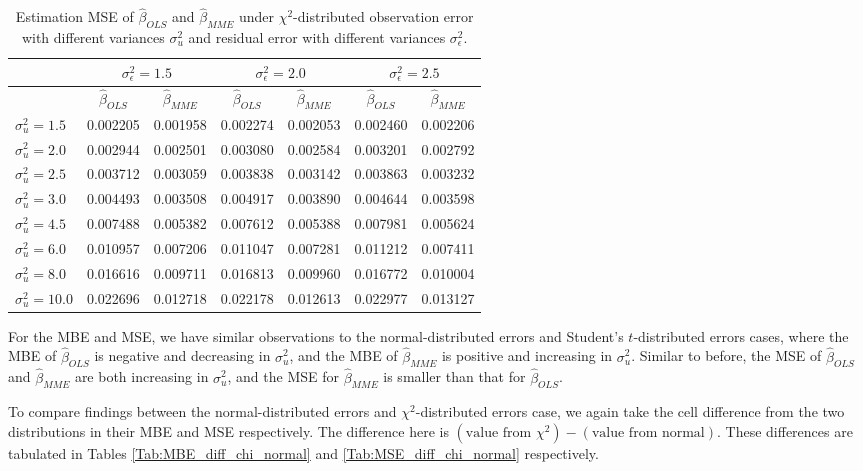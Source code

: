 \documentclass{article}
\begin{document}
\begin{table}[ht]
    \centering
    \caption{Estimation MSE of $\hat{\beta}_{OLS}$ and $\hat{\beta}_{MME}$ under $\chi^2$-distributed observation error with different variances $\sigma^2_u$ and residual error with different variances $\sigma^2_\epsilon$.}
    \label{Tab:MSE_chi}
    \begin{tabular}[t]{lcccccc}
        \hline
        &\multicolumn{2}{c}{$\sigma^2_\epsilon=1.5$}&\multicolumn{2}{c}{$\sigma^2_\epsilon=2.0$}&\multicolumn{2}{c}{$\sigma^2_\epsilon=2.5$}\\
        \hline
        &$\hat{\beta}_{OLS}$&$\hat{\beta}_{MME}$&$\hat{\beta}_{OLS}$&$\hat{\beta}_{MME}$&$\hat{\beta}_{OLS}$&$\hat{\beta}_{MME}$\\
        \hline
        $\sigma^2_u = 1.5$&0.002205&0.001958&0.002274&0.002053&0.002460&0.002206\\
        $\sigma^2_u = 2.0$&0.002944&0.002501&0.003080&0.002584&0.003201&0.002792\\
        $\sigma^2_u = 2.5$&0.003712&0.003059&0.003838&0.003142&0.003863&0.003232\\
        $\sigma^2_u = 3.0$&0.004493&0.003508&0.004917&0.003890&0.004644&0.003598\\
        $\sigma^2_u = 4.5$&0.007488&0.005382&0.007612&0.005388&0.007981&0.005624\\
        $\sigma^2_u = 6.0$&0.010957&0.007206&0.011047&0.007281&0.011212&0.007411\\
        $\sigma^2_u = 8.0$&0.016616&0.009711&0.016813&0.009960&0.016772&0.010004\\
        $\sigma^2_u = 10.0$&0.022696&0.012718&0.022178&0.012613&0.022977&0.013127\\
        \hline
    \end{tabular}
\end{table}

For the MBE and MSE, we have similar observations to the normal-distributed errors and Student's $t$-distributed errors cases,
where the MBE of $\hat{\beta}_{OLS}$ is negative and decreasing in $\sigma^2_u$, 
and the MBE of $\hat{\beta}_{MME}$ is positive and increasing in $\sigma^2_u$.
Similar to before, the MSE of $\hat{\beta}_{OLS}$ and $\hat{\beta}_{MME}$ are both increasing in $\sigma^2_u$,
and the MSE for $\hat{\beta}_{MME}$ is smaller than that for $\hat{\beta}_{OLS}$.

To compare findings between the normal-distributed errors and $\chi^2$-distributed errors case,
we again take the cell difference from the two distributions in their MBE and MSE respectively.
The difference here is $(\textrm{value from } \chi^2) - (\textrm{value from normal})$. 
These differences are tabulated in Tables \ref{Tab:MBE_diff_chi_normal} and \ref{Tab:MSE_diff_chi_normal} respectively.
\end{document}

